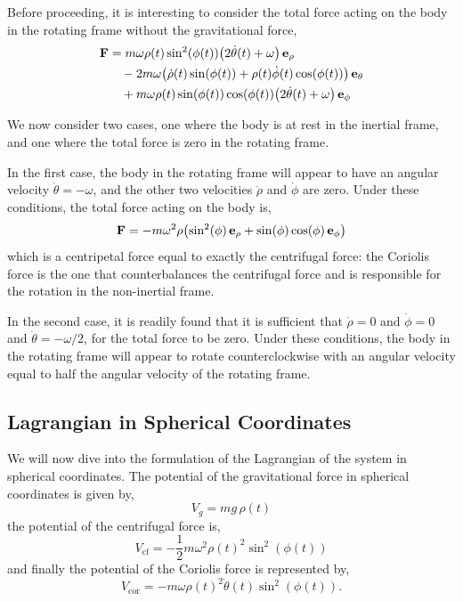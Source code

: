 \documentclass[12pt]{article}
\begin{document}
Before proceeding, it is interesting to consider the total force acting on the body in the
rotating frame without the gravitational force,
\begin{equation}
  \begin{aligned}
    \vb{F} &= m\omega\rho(t)\sin^2(\phi(t))\bigl(2\dot\theta(t)+\omega\bigr)\,\vb{e}_\rho \\
    &\quad - 2m\omega\bigl(\dot\rho(t)\sin(\phi(t)) + \rho(t)\dot\phi(t)\cos(\phi(t))\bigr)\,\vb{e}_\theta \\
    &\quad + m\omega\rho(t)\sin(\phi(t))\cos(\phi(t))\bigl(2\dot\theta(t)+\omega\bigr)\,\vb{e}_\phi
  \end{aligned}
\end{equation}

We now consider two cases, one where the body is at rest in the inertial frame, and one where
the total force is zero in the rotating frame.

In the first case, the body in the rotating frame will appear to have an angular velocity
$\dot\theta = -\omega$, and the other two velocities $\dot\rho$ and $\dot\phi$ are zero.
Under these conditions, the total force acting on the body is,
\begin{equation}
  \vb{F} = -m\omega^2\rho\bigl(\sin^2(\phi)\,\vb{e}_\rho + \sin(\phi)\cos(\phi)\,\vb{e}_\phi\bigr)
\end{equation}
which is a centripetal force equal to exactly the centrifugal force: the Coriolis force is the
one that counterbalances the centrifugal force and is responsible for the rotation in the
non-inertial frame.

In the second case, it is readily found that it is sufficient that $\dot\rho = 0$ and
$\dot\phi = 0$ and $\dot\theta = -\omega/2$, for the total force to be zero. Under these
conditions, the body in the rotating frame will appear to rotate counterclockwise with an
angular velocity equal to half the angular velocity of the rotating frame.

\subsection{Lagrangian in Spherical Coordinates}

We will now dive into the formulation of the Lagrangian of the system in spherical
coordinates. The potential of the gravitational force in spherical coordinates is given by,
\begin{equation}
  V_g = mg\,\rho(t)
\end{equation}
the potential of the centrifugal force is,
\begin{equation}
  V_\text{cf} = -\frac{1}{2}m\omega^2\rho(t)^2\sin^2(\phi(t))
\end{equation}
and finally the potential of the Coriolis force is represented by,
\begin{equation}
  V_\text{cor} = -m\omega\rho(t)^2\dot\theta(t)\sin^2(\phi(t)).
\end{equation}
\end{document}
